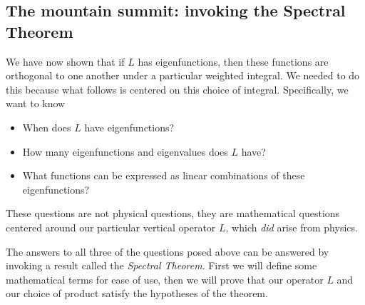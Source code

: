 \subsection{The mountain summit: invoking the Spectral Theorem}
We have now shown that if $L$ has eigenfunctions, then these functions are orthogonal to one another under a particular weighted integral. We needed to do this because what follows is centered on this choice of integral. Specifically, we want to know
\begin{itemize}
  \item When does $L$ have eigenfunctions?
  \item How many eigenfunctions and eigenvalues does $L$ have?
  \item What functions can be expressed as linear combinations of these eigenfunctions?
\end{itemize}
These questions are not physical questions, they are mathematical questions centered around our particular vertical operator $L$, which \textit{did} arise from physics. 
\par The answers to all three of the questions posed above can be answered by invoking a result called the \textit{Spectral Theorem}. First we will define some mathematical terms for ease of use, then we will prove that our operator $L$ and our choice of product satisfy the hypotheses of the theorem. 

